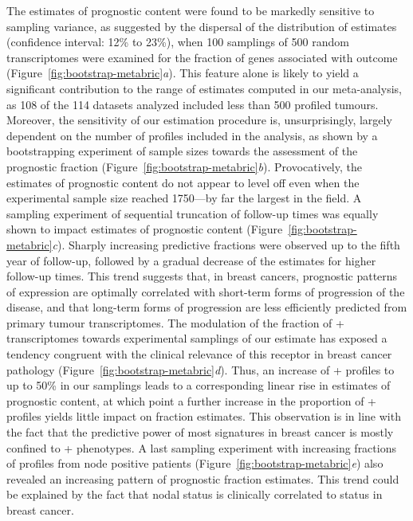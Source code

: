 The estimates of prognostic content were found to be markedly sensitive to
sampling variance, as suggested by the dispersal of the distribution of
estimates (confidence interval: 12\% to 23\%), when \num{100} samplings of
\num{500} random transcriptomes were examined for the fraction of genes
associated with outcome (Figure~\ref{fig:bootstrap-metabric}\emph{a}).  This
feature alone is likely to yield a significant contribution to the range of
estimates computed in our meta-analysis, as 108 of the 114 datasets analyzed
included less than \num{500} profiled tumours.  Moreover, the sensitivity of our
estimation procedure is, unsurprisingly, largely dependent on the number of
profiles included in the analysis, as shown by a bootstrapping experiment of
sample sizes towards the assessment of the prognostic fraction
(Figure~\ref{fig:bootstrap-metabric}\emph{b}).  Provocatively, the estimates of
prognostic content do not appear to level off even when the experimental sample
size reached \num{1750}---by far the largest in the field.  A sampling
experiment of sequential truncation of follow-up times was equally shown to
impact estimates of prognostic content
(Figure~\ref{fig:bootstrap-metabric}\emph{c}).  Sharply increasing predictive
fractions were observed up to the fifth year of follow-up, followed by a gradual
decrease of the estimates for higher follow-up times.  This trend suggests that,
in breast cancers, prognostic patterns of expression are optimally correlated
with short-term forms of progression of the disease, and that long-term forms of
progression are less efficiently predicted from primary tumour transcriptomes.
The modulation of the fraction of + transcriptomes towards
experimental samplings of our estimate has exposed a tendency congruent with the
clinical relevance of this receptor in breast cancer pathology
(Figure~\ref{fig:bootstrap-metabric}\emph{d}).  Thus, an increase of
+ profiles to up to 50\% in our samplings leads to a corresponding
linear rise in estimates of prognostic content, at which point a further
increase in the proportion of + profiles yields little impact on
fraction estimates.  This observation is in line with the fact that the
predictive power of most signatures in breast cancer is mostly confined to
+ phenotypes.\cite{weigelt_challenges_2012} A last sampling
experiment with increasing fractions of profiles from node positive patients
(Figure~\ref{fig:bootstrap-metabric}\emph{e}) also revealed an increasing
pattern of prognostic fraction estimates.  This trend could be explained by the
fact that nodal status is clinically correlated to  status in
breast cancer.

